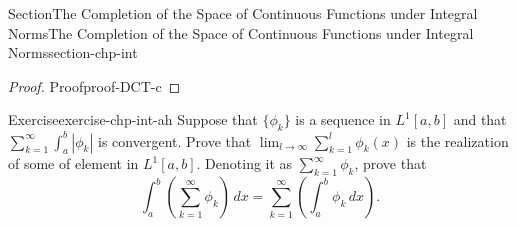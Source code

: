 \documentclass[oneside,10pt,]{article}
\numberwithin{equation}{section}
\begin{document}
\begin{sectionptx}{Section}{The Completion of the Space of Continuous Functions under Integral Norms}{}{The Completion of the Space of Continuous Functions under Integral Norms}{}{}{section-chp-int}
\begin{proof}{Proof}{}{proof-DCT-c}
\end{proof}
\begin{inlineexercise}{Exercise}{}{exercise-chp-int-ah}%
Suppose that \(\{\phi_{k}\}\) is a sequence in \(L^{1}[a, b]\) and that \(\sum_{k=1 }^{\infty}\int_{a}^{b} |\phi_{k}|\) is convergent. Prove that  \(\lim_{l\to\infty} \sum_{k=1 }^{l} \phi_{k}(x)\) is the realization of some of element in \(L^{1}[a, b]\). Denoting it as \(\sum_{k=1 }^{\infty}\phi_{k}\), prove that%
\begin{equation*}
\int_{a}^{b} \left( \sum_{k=1 }^{\infty} \phi_{k}\right)\, dx =
\sum_{k=1 }^{\infty} \left(  \int_{a}^{b} \phi_{k}\, dx\right)\text{.}
\end{equation*}
%
\end{inlineexercise}%
\end{sectionptx}
%
%
\typeout{************************************************}
\typeout{************************************************}
%
\end{document}
